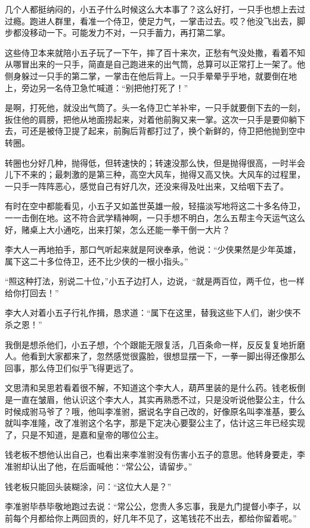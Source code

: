 几个人都挺纳闷的，小五子什么时候这么大本事了？这么好打，一只手也想上去过过瘾。跑进人群里，看准一个侍卫，使足力气，一掌击过去。哎？他没飞出去，脚步都没移动一下。可能发力不对，一只手蓄力，再打第二掌。

这些侍卫本来就陪小五子玩了一下午，摔了百十来次，正愁有气没处撒，看着不知从哪冒出来的一只手，简直是自己跑进来的出气筒，总算可以正常打上一架了。他侧身躲过一只手的第二掌，一掌击在他后背上。一只手晕晕乎乎地，就要倒在地上，旁边另一名侍卫急忙喊道：“别把他打死了！”

是啊，打死他，就没出气筒了。头一名侍卫亡羊补牢，一只手就要倒下去的一刻，扳住他的肩膀，把他从地面捞起来，对着他前胸又来一掌。这次一只手是要仰躺下去，可还是被侍卫提了起来，前胸后背都打过了，换个新鲜的，侍卫把他抛到空中转圈。

转圈也分好几种，抛得低，但转速快的；转速没那么快，但是抛得很高，一时半会儿下不来的；最刺激的是第三种，高空大风车，抛得又高又快。大风车的过程里，一只手一阵阵恶心，感觉自己有好几次，还没来得及吐出来，又给咽下去了。

有时在空中都能看见，小五子又如盖世英雄一般，轻描淡写地将这二十多名侍卫，一一击倒在地。这不符合武学精神啊，一只手想不明白，怎么五帮主今天运气这么好，赌桌上大小通吃，出来打架，怎么还能一拳干倒一大片？

李大人一再地拍手，那口气听起来就是阿谀奉承，他说：“少侠果然是少年英雄，属下这二十多位侍卫，还不比少侠的一根小指头。”

“照这种打法，别说二十位，”小五子边打人，边说，“就是两百位，两千位，也一样给你打回去！”

李大人对着小五子行礼作揖，恳求道：“属下在这里，替我这些下人们，谢少侠不杀之恩！”

我倒是想杀他们，小五子想，个个跟能无限复活，几百条命一样，反反复复地折磨人。他看到大家都来了，忽然感觉很露脸，很想显摆一下，一拳一脚出得还像那么回事，那么侍卫们似乎飞得更远了。

文思清和吴思若看着很不解，不知道这个李大人，葫芦里装的是什么药。钱老板倒是一直在皱眉，他认识这个李大人，其实再熟悉不过，只是没听说他娶公主，什么时候成驸马爷了？哦，他叫李准驸，据说名字自己改的，好像原名叫李准基，要么就叫李准隆，改了准驸这个名字，那是下定决心要娶公主了，估计这三年已经实现了，只是不知道，是嘉和皇帝的哪位公主。

钱老板不想他认出自己，也看出来李准驸没有伤害小五子的意思。他转身要走，李准驸却认出了他，在后面喊他：“常公公，请留步。”

钱老板只能回头装糊涂，问：“这位大人是？”

李准驸毕恭毕敬地跑过去说：“常公公，您贵人多忘事，我是九门提督小李子，以前每个月都给你上两回贡的，好几年不见了，这笔钱花不出去，都给你留着呢。”

